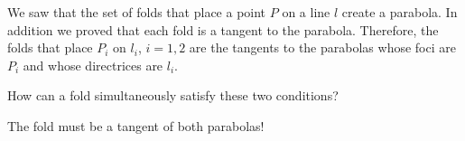 We saw that the set of folds that place a point $P$ on a line $l$ create a parabola. In addition we proved that each fold is a tangent to the parabola. Therefore, the folds that place $P_i$ on $l_i$, $i=1,2$ are the tangents to the parabolas whose foci are $P_i$ and whose directrices are $l_i$. 

\newpage

How can a fold simultaneously satisfy these two conditions? 

The fold must be a tangent of both parabolas!

